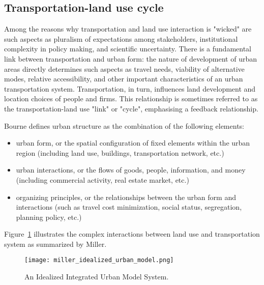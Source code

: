 \subsection{Transportation-land use cycle} \label{subsec:transportation_land_use_cycle}

Among the reasons why transportation and land use interaction is "wicked" are such aspects as pluralism of expectations among stakeholders, institutional complexity in policy making, and scientific uncertainty\cite{Noto2015}.
There is a fundamental link between transportation and urban form: the nature of development of urban areas directly determines such aspects as travel needs, viability of alternative modes, relative accessibility, and other important characteristics of an urban transportation system.
Transportation, in turn, influences land development and location choices of people and firms\cite{Miller1999}.
This relationship is sometimes referred to as the transportation-land use "link" or "cycle", emphasising a feedback relationship\cite{Kelly}.

Bourne\cite{Bourne1982} defines urban structure as the combination of the following elements:
\begin{itemize}
    \item urban form, or the spatial configuration of fixed elements within the urban region (including land use, buildings, transportation network, etc.)
    \item urban interactions, or the flows of goods, people, information, and money (including commercial activity, real estate market, etc.)
    \item organizing principles, or the relationships between the urban form and interactions (such as travel cost minimization, social status, segregation, planning policy, etc.)
\end{itemize}

Figure~\ref{fig:idealized_integrated_urban_model} illustrates the complex interactions between land use and transportation system as summarized by Miller\cite{Miller2018a}.

\begin{figure}[hbt!]
    \centering
    \texttt{[image: miller\_idealized\_urban\_model.png]}
    \caption{An Idealized Integrated Urban Model System\cite{Miller2018a}.}
    \label{fig:idealized_integrated_urban_model}
\end{figure}

